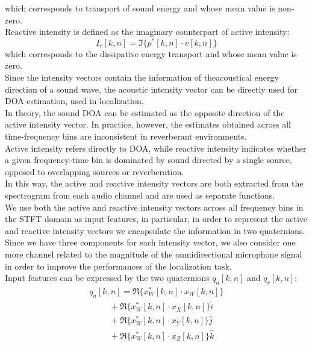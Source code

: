 \documentclass{article}
\begin{document}
    which corresponds to transport of sound energy and whose mean value is non-zero.
    \\ Reactive intensity is defined as the imaginary counterpart of active intensity:
    \begin{equation*}
        I_r [k,n]= \Im \{ p^*[k,n] \cdot v[k,n]\} 
    \end{equation*}
    which corresponds to the dissipative energy transport and whose mean value is zero.
    \\ Since the intensity vectors contain the information of theacoustical energy direction of a sound wave, the acoustic intensity
    vector can be directly used for DOA estimation, used in localization.
    \\ In theory, the sound DOA can be estimated as the opposite direction of the active intensity vector. In practice, however, 
    the estimates obtained across all time-frequency bins are inconsistent in reverberant environments.
    \\ Active intensity refers directly to DOA, while reactive intensity indicates whether a given frequency-time bin is dominated
    by sound directed by a single source, opposed to overlapping sources or reverberation. 
    \\ In this way, the active and reactive intensity vectors are both extracted from the spectrogram from each audio channel and 
    are used as separate functions.
    \\ We use both the active and reactive intensity vectors across all frequency bins in the STFT domain as input features,
    in particular,  in order to represent the active and reactive intensity vectors we encapsulate the information in two quaternions. 
    \\  Since we have three components for each intensity vector, we also consider one more channel related to the magnitude of the
    omnidirectional microphone signal in order to improve the performances of the localization task.
    \\ Input features can be expressed by the two quaternions $q_a[k,n]$ and $q_r[k,n]$:
    \begin{equation*}
            \begin{matrix}
                q_a[k,n]=\Re\{x_W^*[k,n] \cdot x_W[k,n]\} \\
                \hspace{1cm} + \Re\{x_W^*[k,n] \cdot x_X[k,n]\}\hat{i} \\
                \hspace{1cm} + \Re\{x_W^*[k,n] \cdot x_Y[k,n]\}\hat{j} \\
                \hspace{1cm} + \Re\{x_W^*[k,n]\cdot x_Z[k,n]\}\hat{k} \\
            \end{matrix}
    \end{equation*}
\end{document}
